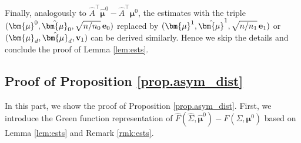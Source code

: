 \documentclass[12pt]{article}
\numberwithin{equation}{section}
\theoremstyle{remark}
\newcommand{\1}{{\rm 1}\kern-0.24em{\rm I}}
\begin{document}
\begin{appendices}
Finally,  analogously to $\widehat{A} ^{\top} \hat{\bm{\mu}}^0 - \widehat{A} ^{\top} {\bm{\mu}}^0  $, the estimates  with the triple $({\bm{\mu}}^0, \hat{{\bm{\mu}}}_0, \sqrt{n/n_0} \, {\bf e}_0)$ replaced by $({\bm{\mu}}^1, \hat{{\bm{\mu}}}^1, \sqrt{n/n_1} \, {\bf e}_1)$ or $({\bm{\mu}}_d, \hat{{\bm{\mu}}}_d , {\bf v}_1)$ can be derived similarly.  Hence we skip the details and conclude the proof of Lemma \ref{lem:ests}. 



\subsection{Proof of Proposition \ref{prop.asym_dist} } \label{subsec:21051501}



In this part, we show the proof of Proposition \ref{prop.asym_dist}. First, we introduce the Green function representation of $\widehat{F}(\widehat\Sigma, \hat{\bm{\mu}}^0)- F(\Sigma, {\bm{\mu}}^0)$ based on Lemma \ref{lem:ests} and Remark \ref{rmk:ests}.


\end{appendices}
\end{document}
